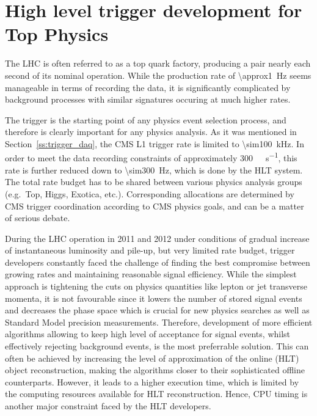 
\chapter{High level trigger development for Top Physics}
\label{c:service_work}
\ifpdf
    \graphicspath{{04_Service_work/plots/}}
\else
    \graphicspath{{04_Service_work/plots/EPS/}{04_Service_work/plots/}}
\fi

The LHC is often referred to as a top quark factory, producing a \ttbar pair nearly each second of its nominal
operation. While the production rate of \SI{\approx1}{\Hz} seems manageable in terms of recording the data, it is
significantly complicated by background processes with similar signatures occuring at much higher rates.

The trigger is the starting point of any physics event selection process, and therefore is clearly important for any
physics analysis. As it was mentioned in Section~\ref{ss:trigger_daq}, the CMS L1 trigger rate is limited to
\SI{\sim100}{\kilo\hertz}. In order to meet the data recording constraints of approximately
\SI{300}{\mega\byte\per\second}, this rate is further reduced down to \SI{\sim300}{\Hz}, which is done by the HLT
system. The total rate budget has to be shared between various physics analysis groups (e.g.\ Top, Higgs, Exotica,
etc.). Corresponding allocations are determined by CMS trigger coordination according to CMS physics goals, and can be a
matter of serious debate.

During the LHC operation in 2011 and 2012 under conditions of gradual increase of instantaneous luminosity and pile-up,
but very limited rate budget, trigger developers constantly faced the challenge of finding the best compromise between
growing rates and maintaining reasonable signal efficiency. While the simplest approach is tightening the cuts on
physics quantities like lepton or jet transverse momenta, it is not favourable since it lowers the number of stored
signal events and decreases the phase space which is crucial for new physics searches as well as Standard Model
precision measurements. Therefore, development of more efficient algorithms allowing to keep high level of acceptance
for signal events, whilst effectively rejecting background events, is the most preferrable solution. This can often be
achieved by increasing the level of approximation of the online (HLT) object reconstruction, making the algorithms
closer to their sophisticated offline counterparts. However, it leads to a higher execution time, which is limited by
the computing resources available for HLT reconstruction. Hence, CPU timing is another major constraint faced by the HLT
developers.

